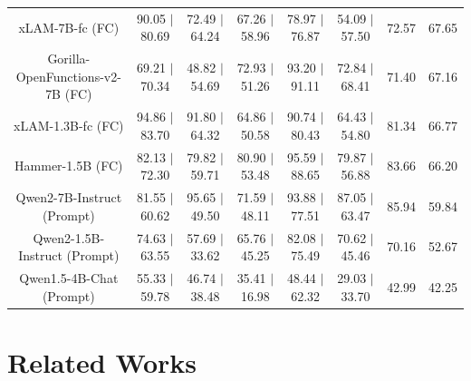 \documentclass{article}
\begin{document}
\begin{table}[ht]
{\begin{tabular}{cccccc|cc}
xLAM-7B-fc (FC) & 90.05 $|$ 80.69 & 72.49 $|$ 64.24 & 67.26 $|$ 58.96 & 78.97 $|$ 76.87 & 54.09 $|$ 57.50 & 72.57 & 67.65 \\
Gorilla-OpenFunctions-v2-7B (FC) & 69.21 $|$ 70.34 & 48.82 $|$ 54.69 & 72.93 $|$ 51.26 & 93.20 $|$ 91.11 & 72.84 $|$ 68.41 & 71.40 & 67.16 \\
xLAM-1.3B-fc (FC) & 94.86 $|$ 83.70 & 91.80 $|$ 64.32 & 64.86 $|$ 50.58 & 90.74 $|$ 80.43 & 64.43 $|$ 54.80 & 81.34 & 66.77 \\
\rowcolor[HTML]{EFEFEF} Hammer-1.5B (FC) & 82.13 $|$ 72.30 & 79.82 $|$ 59.71 & 80.90 $|$ 53.48 & 95.59 $|$ 88.65 & 79.87 $|$ 56.88 & 83.66 & 66.20 \\ 
Qwen2-7B-Instruct (Prompt) & 81.55 $|$ 60.62 & 95.65 $|$ 49.50 & 71.59 $|$ 48.11 & 93.88 $|$ 77.51 & 87.05 $|$ 63.47 & 85.94 & 59.84 \\
Qwen2-1.5B-Instruct (Prompt) & 74.63 $|$ 63.55 & 57.69 $|$ 33.62 & 65.76 $|$ 45.25 & 82.08 $|$ 75.49 & 70.62 $|$ 45.46 & 70.16 & 52.67 \\
Qwen1.5-4B-Chat (Prompt) & 55.33 $|$ 59.78 & 46.74 $|$ 38.48 & 35.41 $|$ 16.98 & 48.44 $|$ 62.32 & 29.03 $|$ 33.70 & 42.99 & 42.25 \\
\bottomrule
\end{tabular}}
\end{table}

\section{Related Works}

\end{document}
